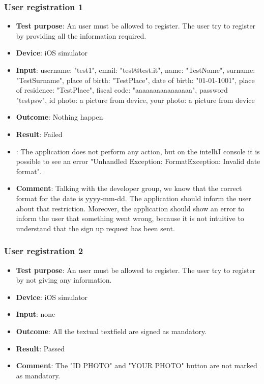 \documentclass[../ATD.tex]{subfiles}
\begin{document}
    \subsubsection{User registration 1}\label{subsubsec:user-registration-1}
    \begin{itemize}
        \item \textbf{Test purpose}: An user must be allowed to register.
        The user try to register by providing all the information required.
        \item \textbf{Device}: iOS simulator
        \item \textbf{Input}: username: "test1", email: "test@test.it", name: "TestName", surname: "TestSurname", place of birth: "TestPlace", date of birth: "01-01-1001", place of residence: "TestPlace", fiscal code: "aaaaaaaaaaaaaaaa", password "testpsw", id photo: a picture from device, your photo: a picture from device
        \item \textbf{Outcome}: Nothing happen
        \item \textbf{Result}: Failed
        \item {}: The application does not perform any action, but on the intelliJ console it is possible to see an error "Unhandled Exception: FormatException: Invalid date format".
        \item \textbf{Comment}: Talking with the developer group, we know that the correct format for the date is yyyy-mm-dd.
        The application should inform the user about that restriction.
        Moreover, the application should show an error to inform the user that something went wrong, because it is not intuitive to understand that the sign up request has been sent.
    \end{itemize}

    \subsubsection{User registration 2}\label{subsubsec:user-registration-2}
    \begin{itemize}
        \item \textbf{Test purpose}: An user must be allowed to register.
        The user try to register by not giving any information.
        \item \textbf{Device}: iOS simulator
        \item \textbf{Input}: none
        \item \textbf{Outcome}: All the textual textfield are signed as mandatory.
        \item \textbf{Result}: Passed
        \item \textbf{Comment}: The "ID PHOTO" and "YOUR PHOTO" button are not marked as mandatory.
    \end{itemize}
\end{document}
